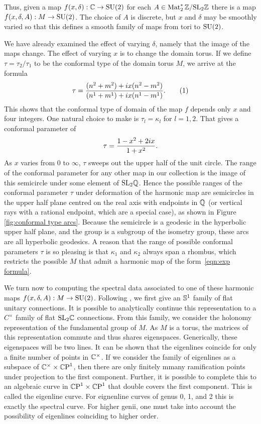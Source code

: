 \documentclass{article}
\begin{document}
Thus, given a map $f(x,\delta) : \C \to \SU(2)$ for each $A \in \Mat_2^*\Z / \SL_2\Z$ there is a map $f(x,\delta,A) : M \to \SU(2)$. The choice of $A$ is discrete, but $x$ and $\delta$ may be smoothly varied so that this defines a smooth family of maps from tori to $\SU(2)$.

We have already examined the effect of varying $\delta$, namely that the image of the maps change. The effect of varying $x$ is to change the domain torus. If we define $\tau = \tau_2/\tau_1$ to be the conformal type of the domain torus $M$, we arrive at the formula
\[
\tau
= \frac{(n^2 + m^2) + \iu x(n^2 - m^2)}
{(n^1+m^1) +\iu x(n^1-m^1)}.
\labelthis{eqn:conformal type}
\]
This shows that the conformal type of domain of the map $f$ depends only $x$ and four integers. One natural choice to make is $\tau_l=\kappa_l$ for $l=1,2$. That gives a conformal parameter of 
\[
\tau = \frac{1-x^2 + 2\iu x}{1+x^2}.
\]
As $x$ varies from $0$ to $\infty$, $\tau$ sweeps out the upper half of the unit circle. The range of the conformal parameter for any other map in our collection is the image of this semicircle under some element of $\SL_2\Q$.
Hence the possible ranges of the conformal parameter $\tau$ under deformation of the harmonic map are semicircles in the upper half plane centred on the real axis with endpoints in $\Q$ (or vertical rays with a rational endpoint, which are a special case), as shown in Figure \ref{fig:conformal type arcs}. Because the semicircle is a geodesic in the hyperbolic upper half plane, and the group is a subgroup of the isometry group, these arcs are all hyperbolic geodesics. 
A reason that the range of possible conformal parameters $\tau$ is so pleasing is that $\kappa_1$ and $\kappa_2$ always span a rhombus, which restricts the possible $M$ that admit a harmonic map of the form~\eqref{eqn:exp formula}.





We turn now to computing the spectral data associated to one of these harmonic maps $f(x,\delta,A): M \to \SU(2)$. Following \cite{Hitchin1990}, we first give an $\S^1$ family of flat unitary connections. It is possible to analytically continue this representation to a $C^\times$ family of flat $\SL_2\C$ connections. From this family, we consider the holonomy representation of the fundamental group of $M$. As $M$ is a torus, the matrices of this representation commute and thus shares eigenspaces. Generically, these eigenspaces will be two lines. It can be shown that the eigenlines coincide for only a finite number of points in $\C^\times$. If we consider the family of eigenlines as a subspace of $\C^\times \times \CP^1$, then there are only finitely mmany ramification points under projection to the first component. Further, it is possible to complete this to an algebraic curve in $\CP^1 \times \CP^1$ that double covers the first component. This is called the eigenline curve. For eignenline curves of genus 0, 1, and 2 this is exactly the spectral curve. For higher genii, one must take into account the possibility of eigenlines coinciding to higher order.
\end{document}
